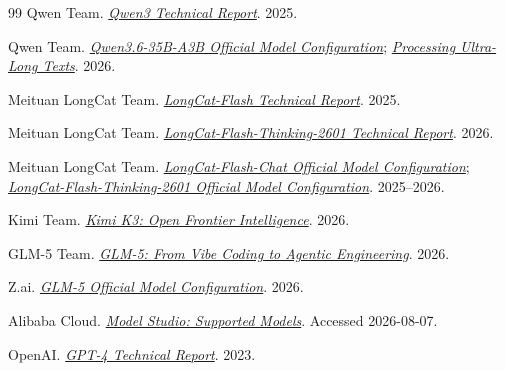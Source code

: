 \documentclass[UTF8,fontset=none,a4paper,10pt]{ctexart}
\begin{document}
\begin{thebibliography}{99}
Qwen Team. \href{https://arxiv.org/abs/2505.09388}{\textit{Qwen3 Technical Report}}. 2025.

Qwen Team. \href{https://huggingface.co/Qwen/Qwen3.6-35B-A3B-FP8/blob/main/config.json}{\textit{Qwen3.6-35B-A3B Official Model Configuration}}; \href{https://huggingface.co/Qwen/Qwen3.6-35B-A3B/blob/main/README.md}{\textit{Processing Ultra-Long Texts}}. 2026.

Meituan LongCat Team. \href{https://arxiv.org/abs/2509.01322}{\textit{LongCat-Flash Technical Report}}. 2025.

Meituan LongCat Team. \href{https://arxiv.org/abs/2601.16725}{\textit{LongCat-Flash-Thinking-2601 Technical Report}}. 2026.

Meituan LongCat Team. \href{https://huggingface.co/meituan-longcat/LongCat-Flash-Chat/blob/main/config.json}{\textit{LongCat-Flash-Chat Official Model Configuration}}; \href{https://huggingface.co/meituan-longcat/LongCat-Flash-Thinking-2601-FP8/blob/main/config.json}{\textit{LongCat-Flash-Thinking-2601 Official Model Configuration}}. 2025--2026.

Kimi Team. \href{https://arxiv.org/abs/2607.24653}{\textit{Kimi K3: Open Frontier Intelligence}}. 2026.

GLM-5 Team. \href{https://arxiv.org/abs/2602.15763}{\textit{GLM-5: From Vibe Coding to Agentic Engineering}}. 2026.

Z.ai. \href{https://huggingface.co/zai-org/GLM-5/blob/main/config.json}{\textit{GLM-5 Official Model Configuration}}. 2026.

Alibaba Cloud. \href{https://help.aliyun.com/en/model-studio/models}{\textit{Model Studio: Supported Models}}. Accessed 2026-08-07.

OpenAI. \href{https://arxiv.org/abs/2303.08774}{\textit{GPT-4 Technical Report}}. 2023.

\end{thebibliography}
\end{document}
